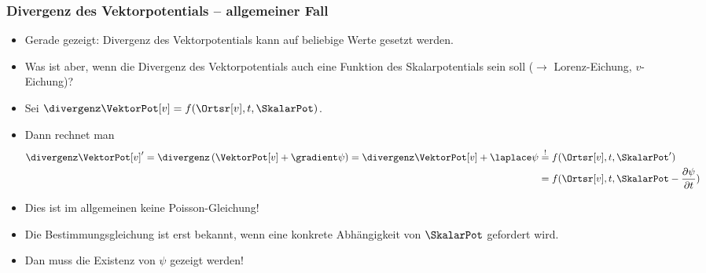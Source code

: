   \begin{frame}
  \frametitle{Divergenz des Vektorpotentials -- allgemeiner Fall}
  \begin{itemize}[<+->]
  \item Gerade gezeigt: Divergenz des Vektorpotentials kann auf beliebige Werte gesetzt werden.
  \item Was ist aber, wenn die Divergenz des Vektorpotentials auch eine \alert{Funktion des Skalarpotentials} sein soll ($\to$ Lorenz-Eichung, $v$-Eichung)?
  \item Sei $\divergenz \VektorPot[v] = f(\Ortsr[v], t, \SkalarPot)$.
  \item Dann rechnet man
    \begin{equation}
      \begin{aligned}
        \divergenz \VektorPot[v]^\prime = \divergenz\left( \VektorPot[v] +\gradient\psi\right) = \divergenz \VektorPot[v] +\laplace\psi &\stackrel{!}{=} f(\Ortsr[v], t, \SkalarPot^\prime)  \\
        &=f(\Ortsr[v], t, \SkalarPot-\frac{\partial \psi}{\partial t})
        \end{aligned}
      \end{equation}
    \item Dies ist im allgemeinen keine Poisson-Gleichung!
    \item Die Bestimmungsgleichung ist erst bekannt, wenn eine konkrete Abhängigkeit von $\SkalarPot$ gefordert wird.
      \item Dan muss die Existenz von $\psi$ gezeigt werden!
  \end{itemize}
  \end{frame}



